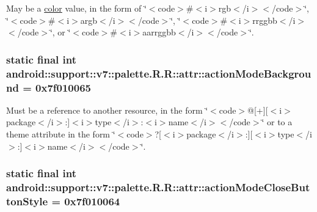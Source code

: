 May be a \hyperlink{classandroid_1_1support_1_1v7_1_1palette_1_1_r_1_1color}{color} value, in the form of \char`\"{}$<$code$>$\#$<$i$>$rgb$<$/i$>$$<$/code$>$\char`\"{}, \char`\"{}$<$code$>$\#$<$i$>$argb$<$/i$>$$<$/code$>$\char`\"{}, \char`\"{}$<$code$>$\#$<$i$>$rrggbb$<$/i$>$$<$/code$>$\char`\"{}, or \char`\"{}$<$code$>$\#$<$i$>$aarrggbb$<$/i$>$$<$/code$>$\char`\"{}. \hypertarget{classandroid_1_1support_1_1v7_1_1palette_1_1_r_1_1attr_26654411d672646dc24232e130de0656}{
\subsubsection[{actionModeBackground}]{\setlength{\rightskip}{0pt plus 5cm}static final int android::support::v7::palette.R.R::attr::actionModeBackground = 0x7f010065}}
\label{classandroid_1_1support_1_1v7_1_1palette_1_1_r_1_1attr_26654411d672646dc24232e130de0656}


Must be a reference to another resource, in the form \char`\"{}$<$code$>$@\mbox{[}+\mbox{]}\mbox{[}$<$i$>$package$<$/i$>$:\mbox{]}$<$i$>$type$<$/i$>$:$<$i$>$name$<$/i$>$$<$/code$>$\char`\"{} or to a theme attribute in the form \char`\"{}$<$code$>$?\mbox{[}$<$i$>$package$<$/i$>$:\mbox{]}\mbox{[}$<$i$>$type$<$/i$>$:\mbox{]}$<$i$>$name$<$/i$>$$<$/code$>$\char`\"{}. \hypertarget{classandroid_1_1support_1_1v7_1_1palette_1_1_r_1_1attr_6a3f492268681696ca1a0667db789108}{
\subsubsection[{actionModeCloseButtonStyle}]{\setlength{\rightskip}{0pt plus 5cm}static final int android::support::v7::palette.R.R::attr::actionModeCloseButtonStyle = 0x7f010064}}
\label{classandroid_1_1support_1_1v7_1_1palette_1_1_r_1_1attr_6a3f492268681696ca1a0667db789108}


